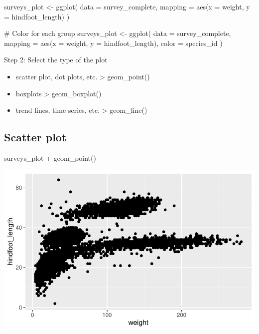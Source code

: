 \documentclass[
  letterpaper,
  DIV=11,
  numbers=noendperiod]{scrreprt}
\newenvironment{Shaded}{\begin{snugshade}}{\end{snugshade}}
\newcommand{\AttributeTok}[1]{\textcolor[rgb]{0.40,0.45,0.13}{#1}}
\newcommand{\CommentTok}[1]{\textcolor[rgb]{0.37,0.37,0.37}{#1}}
\newcommand{\FunctionTok}[1]{\textcolor[rgb]{0.28,0.35,0.67}{#1}}
\newcommand{\NormalTok}[1]{\textcolor[rgb]{0.00,0.23,0.31}{#1}}
\newcommand{\OtherTok}[1]{\textcolor[rgb]{0.00,0.23,0.31}{#1}}
\newcommand{\SpecialCharTok}[1]{\textcolor[rgb]{0.37,0.37,0.37}{#1}}
\providecommand{\tightlist}{%
  \setlength{\itemsep}{0pt}\setlength{\parskip}{0pt}}\usepackage{longtable,booktabs,array}
\begin{document}
\begin{Shaded}
\begin{Highlighting}[]
\NormalTok{surveys\_plot }\OtherTok{\textless{}{-}} \FunctionTok{ggplot}\NormalTok{(}
  \AttributeTok{data =}\NormalTok{ survey\_complete,}
  \AttributeTok{mapping =} \FunctionTok{aes}\NormalTok{(}\AttributeTok{x =}\NormalTok{ weight, }\AttributeTok{y =}\NormalTok{ hindfoot\_length)}
\NormalTok{)}

\CommentTok{\# Color for each group}
\NormalTok{surveys\_plot }\OtherTok{\textless{}{-}} \FunctionTok{ggplot}\NormalTok{(}
  \AttributeTok{data =}\NormalTok{ survey\_complete,}
  \AttributeTok{mapping =} \FunctionTok{aes}\NormalTok{(}\AttributeTok{x =}\NormalTok{ weight, }\AttributeTok{y =}\NormalTok{ hindfoot\_length),}
  \AttributeTok{color =}\NormalTok{ species\_id}
\NormalTok{)}
\end{Highlighting}
\end{Shaded}

Step 2: Select the type of the plot

\begin{itemize}
\tightlist
\item
  scatter plot, dot plots, etc. \textgreater{} geom\_point()
\item
  boxplots \textgreater{} geom\_boxplot()
\item
  trend lines, time series, etc. \textgreater{} geom\_line()
\end{itemize}

\subsection{Scatter plot}\label{scatter-plot}

\begin{Shaded}
\begin{Highlighting}[]
\NormalTok{surveys\_plot }\SpecialCharTok{+} \FunctionTok{geom\_point}\NormalTok{()}
\end{Highlighting}
\end{Shaded}

\includegraphics{src/notebooks/r_files/figure-pdf/unnamed-chunk-49-1.pdf}
\end{document}
